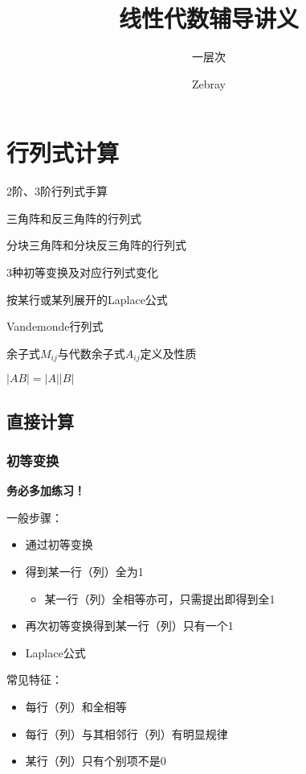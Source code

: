 \documentclass[lang=cn,newtx,10pt,scheme=chinese]{elegantbook}
\title{线性代数辅导讲义}
\subtitle{一层次}
\author{Zebray}
\begin{document}
\maketitle
\frontmatter

\pagestyle{empty} %

\tableofcontents

\mainmatter

\chapter{行列式计算}

\begin{introduction}[需要熟悉的知识点]
	\item 2阶、3阶行列式手算
	\item 三角阵和反三角阵的行列式
	\item 分块三角阵和分块反三角阵的行列式
	\item 3种初等变换及对应行列式变化
	\item 按某行或某列展开的Laplace公式
	\item Vandemonde行列式
	\item 余子式$M_{ij}$与代数余子式$A_{ij}$定义及性质
	\item $\left|AB\right| = \left|A\right| \left|B\right|$
\end{introduction}

\section{直接计算}

\subsection{初等变换}
\par
\textbf{务必多加练习！}
\par
一般步骤：
\begin{itemize}
  	\item 通过初等变换
  	\item 得到某一行（列）全为1
		\begin{itemize}
			\item 某一行（列）全相等亦可，只需提出即得到全1
		\end{itemize}
    \item 再次初等变换得到某一行（列）只有一个1
    \item Laplace公式
\end{itemize}
\par
常见特征：
\begin{itemize}
	\item 每行（列）和全相等
	\item 每行（列）与其相邻行（列）有明显规律
	\item 某行（列）只有个别项不是0
\end{itemize}
\end{document}
